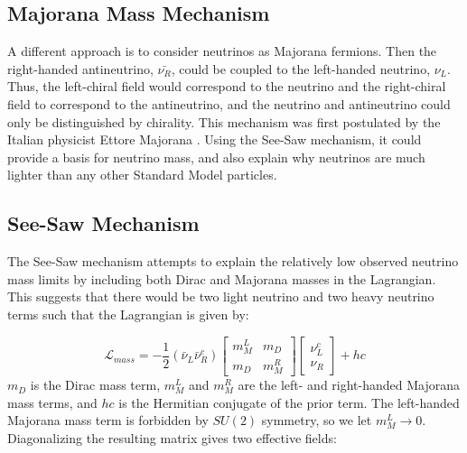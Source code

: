 \subsection{Majorana Mass Mechanism}
A different approach is to consider neutrinos as Majorana fermions. Then the right-handed antineutrino, $\bar{\nu_R}$, could be coupled to the left-handed neutrino, $\nu_L$. Thus, the left-chiral field would correspond to the neutrino and the right-chiral field to correspond to the antineutrino, and the neutrino and antineutrino could only be distinguished by chirality. This mechanism was first postulated by the Italian physicist Ettore Majorana \cite{Majorana_1937}. Using the See-Saw mechanism, it could provide a basis for neutrino mass, and also explain why neutrinos are much lighter than any other Standard Model particles.


\subsection{See-Saw Mechanism}
The See-Saw mechanism attempts to explain the relatively low observed neutrino mass limits by including both Dirac and Majorana masses in the Lagrangian. This suggests that there would be two light neutrino and two heavy neutrino terms such that the Lagrangian is given by:



\begin{equation}\label{mass_lagrangian}
\mathcal{L}_{mass} = -\frac{1}{2}(\bar{\nu}_L\bar{\nu}_R^c) \begin{bmatrix} m_M^L & m_D \\ m_D & m_M^R \end{bmatrix} \begin{bmatrix} \nu_L^c \\ \nu_R \end{bmatrix} + hc
\end{equation}
\noindent
$m_D$ is the Dirac mass term, $m_M^L$ and $m_M^R$ are the left- and right-handed Majorana mass terms, and $hc$ is the Hermitian conjugate of the prior term. The left-handed Majorana mass term is forbidden by $SU (2)$ symmetry, so we let $m_M^L \rightarrow 0$. Diagonalizing the resulting matrix gives two effective fields: 


